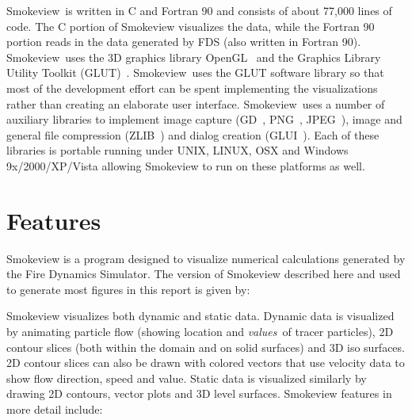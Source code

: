 \documentclass[11pt,twoside]{book}
\newcommand{\Smokeview}{{Smokeview}}
\newcommand{\smokeview}{{Smokeview}}
\begin{document}
\Smokeview\ is written in C and Fortran 90 and consists of about
77,000 lines of code. The C portion of Smokeview visualizes the
data, while the Fortran 90 portion reads in the data generated by
FDS (also written in Fortran 90). \smokeview\ uses the 3D graphics
library OpenGL~\cite{OpenGLRed} and the Graphics Library Utility
Toolkit (GLUT)~\cite{OpenGLGlut}. \Smokeview\ uses the GLUT
software library so that most of the development effort can be
spent implementing the visualizations rather than creating an
elaborate user interface.  \Smokeview\ uses a number of auxiliary
libraries to implement image capture (GD~\cite{BOUTELL,GDLIB},
PNG~\cite{PNGLIB}, JPEG~\cite{JPEGLIB}), image and general file
compression (ZLIB~\cite{ZLIB}) and dialog creation
(GLUI~\cite{GLUILIB}). Each of these libraries is portable running
under UNIX, LINUX, OSX and Windows 9x/2000/XP/Vista allowing Smokeview to run
on these platforms as well.

\section{Features}

Smokeview is a program designed to visualize numerical
calculations generated by the Fire Dynamics Simulator.
The version of Smokeview described here and used
to generate most figures in this report is given by:
{

}

Smokeview visualizes both dynamic and static data.  Dynamic
data is visualized by animating particle flow (showing
location and {\em values}\ of tracer particles), 2D contour
slices (both within the domain and on solid surfaces) and
3D iso surfaces.  2D contour slices can also be drawn
with colored vectors that use velocity data to show flow
direction, speed and value. Static data is visualized
similarly by drawing 2D contours, vector plots and 3D level
surfaces. Smokeview features in more detail include:
\end{document}
